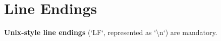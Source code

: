 \section{Line Endings}
\textbf{Unix-style line endings} (`LF`, represented as `\textbackslash n`) are mandatory.

